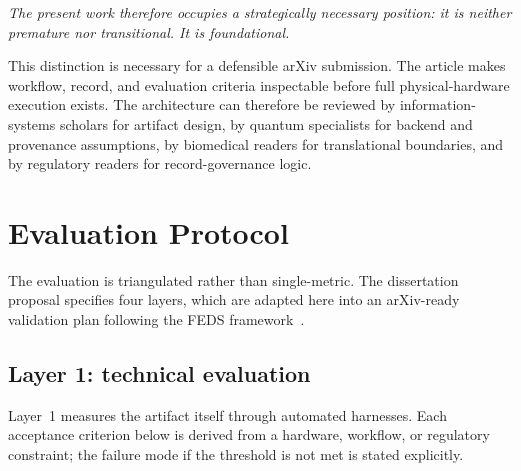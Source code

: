 \documentclass[11pt,letterpaper]{article}
\begin{document}
\textit{The present work therefore occupies a strategically necessary position: it is
neither premature nor transitional.  It is foundational.}

This distinction is necessary for a defensible arXiv submission.  The article makes workflow,
record, and evaluation criteria inspectable before full physical-hardware execution exists.
The architecture can therefore be reviewed by information-systems scholars for artifact design,
by quantum specialists for backend and provenance assumptions, by biomedical readers for
translational boundaries, and by regulatory readers for record-governance logic.

\section{Evaluation Protocol}

The evaluation is triangulated rather than single-metric.  The dissertation proposal specifies
four layers, which are adapted here into an arXiv-ready validation plan following the FEDS
framework~\cite{venable2016}.

\subsection{Layer 1: technical evaluation}

Layer~1 measures the artifact itself through automated harnesses.  Each acceptance criterion
below is derived from a hardware, workflow, or regulatory constraint; the failure mode if
the threshold is not met is stated explicitly.
\end{document}
